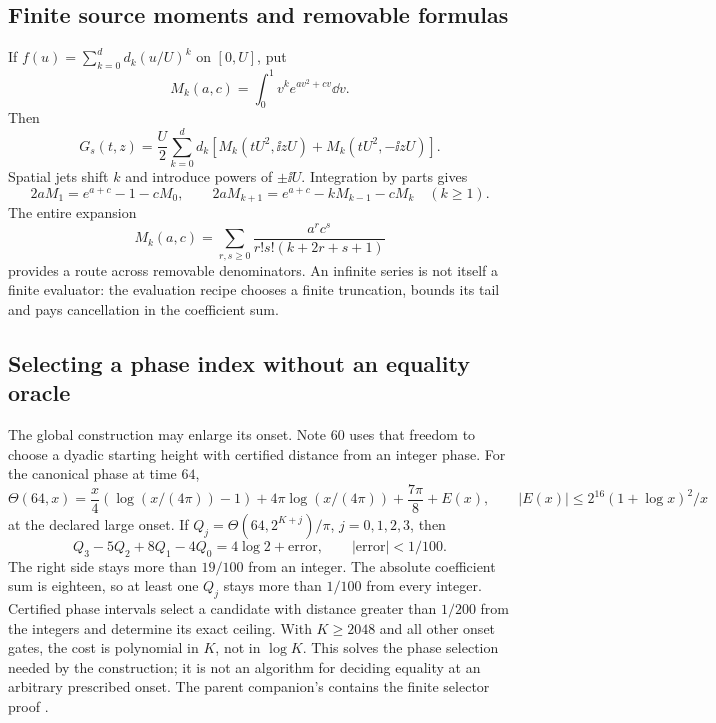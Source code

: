\subsection{Finite source moments and removable formulas}
If $f(u)=\sum_{k=0}^d d_k(u/U)^k$ on $[0,U]$, put
\[
 M_k(a,c)=\int_0^1v^ke^{av^2+cv}\dd v.
\]
Then
\begin{equation}
 G_s(t,z)=\frac U2\sum_{k=0}^d d_k
                  [M_k(tU^2,\ii zU)+M_k(tU^2,-\ii zU)].
 \label{eq:source-moments}
\end{equation}
Spatial jets shift $k$ and introduce powers of $\pm\ii U$.
Integration by parts gives
\[
 2aM_1=e^{a+c}-1-cM_0,\qquad
 2aM_{k+1}=e^{a+c}-kM_{k-1}-cM_k\quad(k\ge1).
\]
The entire expansion
\begin{equation}
 M_k(a,c)=\sum_{r,s\ge0}
                 \frac{a^rc^s}{r!s!(k+2r+s+1)}
 \label{eq:entire-moments}
\end{equation}
provides a route across removable denominators. An infinite series is
not itself a finite evaluator: the evaluation recipe chooses a finite
truncation, bounds its tail and pays cancellation in the coefficient sum.

\subsection{Selecting a phase index without an equality oracle}
The global construction may enlarge its onset. Note 60 uses that
freedom to choose a dyadic starting height with certified distance
from an integer phase. For the canonical phase at time $64$,
\[
 \Theta(64,x)=\frac x4(\log(x/(4\pi))-1)
              +4\pi\log(x/(4\pi))+\frac{7\pi}8+E(x),
 \qquad |E(x)|\le2^{16}(1+\log x)^2/x
\]
at the declared large onset. If $Q_j=\Theta(64,2^{K+j})/\pi$,
$j=0,1,2,3$, then
\begin{equation}
 Q_3-5Q_2+8Q_1-4Q_0=4\log2+\text{error},
 \qquad |\text{error}|<1/100.
 \label{eq:phase-stencil}
\end{equation}
The right side stays more than $19/100$ from an integer. The absolute
coefficient sum is eighteen, so at least one $Q_j$ stays more than
$1/100$ from every integer. Certified phase intervals select a candidate with distance greater than
$1/200$ from the integers and determine its exact ceiling. With $K\ge2048$ and all other
onset gates, the cost is polynomial in $K$, not in $\log K$.
This solves the phase selection needed by the construction; it is
not an algorithm for deciding equality at an arbitrary prescribed
onset. The parent companion's 
contains the finite selector proof \cite{phase}.


